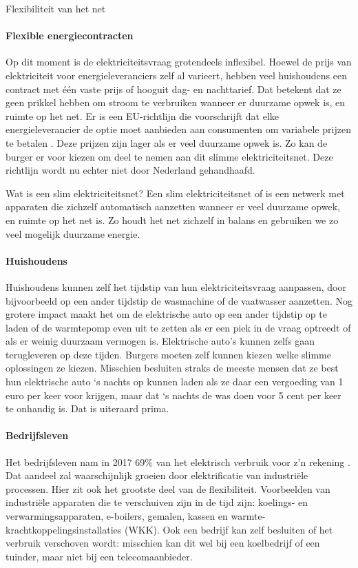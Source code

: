 \begin{voorstel}{Flexibiliteit van het net}
\begin{multicols*}{2}
\begin{overwegingen}
\paragraph{Flexible energiecontracten}
Op dit moment is de elektriciteitsvraag grotendeels inflexibel. Hoewel de prijs van elektriciteit voor energieleveranciers zelf al varieert, hebben veel huishoudens een contract met één vaste prijs of hooguit dag- en nachttarief. Dat betekent dat ze geen prikkel hebben om stroom te verbruiken wanneer er duurzame opwek is, en ruimte op het net. Er is een EU-richtlijn die voorschrijft dat elke energieleverancier de optie moet aanbieden aan consumenten om variabele prijzen te betalen \parencite{europees_parlement_notitle_nodate}. Deze prijzen zijn lager als er veel duurzame opwek is. Zo kan de burger er voor kiezen om deel te nemen aan dit slimme elektriciteitsnet. Deze richtlijn wordt nu echter niet door Nederland gehandhaafd.

\begin{infobox}{Wat is een slim elektriciteitsnet?}
Een slim elektriciteitsnet of  is een netwerk met apparaten die zichzelf automatisch aanzetten wanneer er veel duurzame opwek, en ruimte op het net is. Zo houdt het net zichzelf in balans en gebruiken we zo veel mogelijk duurzame energie.
\end{infobox}

\paragraph{Huishoudens}
Huishoudens kunnen zelf het tijdstip van hun elektriciteitsvraag aanpassen, door bijvoorbeeld op een ander tijdstip de wasmachine of de vaatwasser aanzetten. Nog grotere impact maakt het om de elektrische auto op een ander tijdstip op te laden of de warmtepomp even uit te zetten als er een piek in de vraag optreedt of als er weinig duurzaam vermogen is. Elektrische auto’s kunnen zelfs gaan terugleveren op deze tijden. Burgers moeten zelf kunnen kiezen welke slimme oplossingen ze kiezen. Misschien besluiten straks de meeste mensen dat ze best hun elektrische auto ‘s nachts op kunnen laden als ze daar een vergoeding van 1 euro per keer voor krijgen, maar dat ‘s nachts de was doen voor 5 cent per keer te onhandig is. Dat is uiteraard prima.

\paragraph{Bedrijfsleven}
Het bedrijfsleven nam in 2017 69\% van het elektrisch verbruik voor z’n rekening \parencite{centraal_bureau_voor_de_statistiek_statline_nodate}. Dat aandeel zal waarschijnlijk groeien door elektrificatie van industriële processen. Hier zit ook het grootste deel van de flexibiliteit. Voorbeelden van industriële apparaten die te verschuiven zijn in de tijd zijn: koelings- en verwarmingsapparaten, e-boilers, gemalen, kassen en warmte-krachtkoppelingsinstallaties (WKK). Ook een bedrijf kan zelf besluiten of het verbruik verschoven wordt: misschien kan dit wel bij een koelbedrijf of een tuinder, maar niet bij een telecomaanbieder.


\end{overwegingen}
\end{multicols*}
\end{voorstel}
